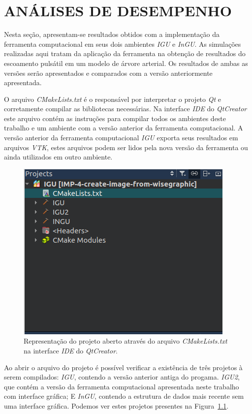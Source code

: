 \chapter{ANÁLISES DE DESEMPENHO}\label{sec:resultados2}

Nesta seção, apresentam-se resultados obtidos com a implementação da ferramenta computacional em seus dois ambientes \textit{IGU} e \textit{InGU}. As simulações realizadas aqui tratam da aplicação da ferramenta na obtenção de resultados do escoamento pulsátil em um modelo de árvore arterial. Os resultados de ambas as versões serão apresentados e comparados com a versão anteriormente apresentada.

O arquivo \textit{CMakeLists.txt} é o responsável por interpretar o projeto \textit{Qt} e corretamente compilar as bibliotecas necessárias. Na interface \textit{IDE} do \textit{QtCreator} este arquivo contém as instruções para compilar todos os ambientes deste trabalho e um ambiente com a versão anterior da ferramenta computacional. A versão anterior da ferramenta computacional \textit{IGU} exporta seus resultados em arquivos \textit{VTK}, estes arquivos podem ser lidos pela nova versão da ferramenta ou ainda utilizados em outro ambiente.


\begin{figure}[!htbp]
	\centering
	\includegraphics[scale=1.5]{Figures/cmake_print.png}
	\caption{Representação do projeto aberto através do arquivo \textit{CMakeLists.txt} na interface \textit{IDE} do \textit{QtCreator}.}
	\label{fig:cmake}
\end{figure}


Ao abrir o arquivo do projeto é possível verificar a existência de três projetos à serem compilados: \textit{IGU}, contendo a versão anterior antiga do progama. \textit{IGU2}, que contém a versão da ferramenta computacional apresentada neste trabalho com interface gráfica; E \textit{InGU}, contendo a estrutura de dados mais recente sem uma interface gráfica. Podemos ver estes projetos presentes na Figura~\ref{fig:cmake}.

